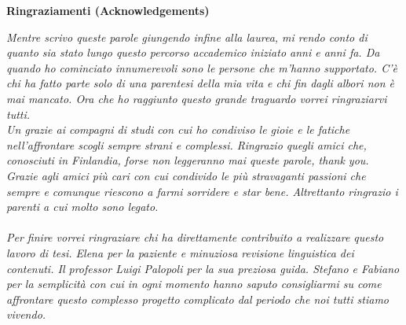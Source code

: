 \thispagestyle{empty}

\begin{center}
  {\bf \Huge Ringraziamenti (Acknowledgements)}
\end{center}
\vspace{2.5cm}
\emph{Mentre scrivo queste parole giungendo infine alla laurea, mi rendo conto di quanto sia stato lungo questo percorso accademico iniziato anni e anni fa. Da quando ho cominciato innumerevoli sono le persone che m'hanno supportato. C'è chi ha fatto parte solo di una parentesi della mia vita e chi fin dagli albori non è mai mancato. Ora che ho raggiunto questo grande traguardo vorrei ringraziarvi tutti.\\
Un grazie ai compagni di studi con cui ho condiviso le gioie e le fatiche nell'affrontare scogli sempre strani e complessi. Ringrazio quegli amici che, conosciuti in Finlandia, forse non leggeranno mai queste parole, thank you. Grazie agli amici più cari con cui condivido le più stravaganti passioni che sempre e comunque riescono a farmi sorridere e star bene. Altrettanto ringrazio i parenti a cui molto sono legato.\\
\\
Per finire vorrei ringraziare chi ha direttamente contribuito a realizzare questo lavoro di tesi. Elena per la paziente e minuziosa revisione linguistica dei contenuti. Il professor Luigi Palopoli per la sua preziosa guida. Stefano e Fabiano per la semplicità con cui in ogni momento hanno saputo consigliarmi su come affrontare questo complesso progetto complicato dal periodo che noi tutti stiamo vivendo.}
